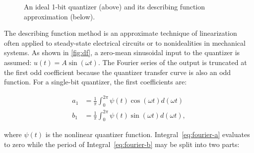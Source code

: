 \begin{figure}
	\caption{An ideal 1-bit quantizer (above) and its describing function approximation (below).} \label{fig:df}
\end{figure}

The describing function method \cite{Taylor1999} is an approximate technique of linearization often applied to steady-state electrical circuits or to nonidealities in mechanical systems. As shown in \autoref{fig:df}, a zero-mean sinusoidal input to the quantizer is assumed: $u(t) = A\sin(\omega t)$. The Fourier series of the output is truncated at the first odd coefficient because the quantizer transfer curve is also an odd function. For a single-bit quantizer, the first coefficients are:

\begin{align}
	a_1 &= \frac{1}{\pi} \int_0^{2\pi} \psi(t)\cos(\omega t) d(\omega t) \label{eq:fourier-a} \\
	b_1 &= \frac{1}{\pi} \int_0^{2\pi} \psi(t)\sin(\omega t) d(\omega t), \label{eq:fourier-b}
\end{align}

where $\psi(t)$ is the nonlinear quantizer function. Integral~\ref{eq:fourier-a} evaluates to zero while the period of Integral~\ref{eq:fourier-b} may be split into two parts:

